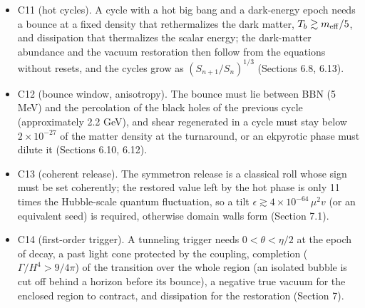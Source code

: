 \documentclass[11pt,a4paper]{article}
\begin{document}
\begin{itemize}
\item C11 (hot cycles). A cycle with a hot big bang and a dark-energy epoch needs a bounce at a fixed density that rethermalizes the dark matter, $T_b\gtrsim m_{\rm eff}/5$, and dissipation that thermalizes the scalar energy; the dark-matter abundance and the vacuum restoration then follow from the equations without resets, and the cycles grow as $(S_{n+1}/S_n)^{1/3}$ (Sections 6.8, 6.13).
\item C12 (bounce window, anisotropy). The bounce must lie between BBN (5 MeV) and the percolation of the black holes of the previous cycle (approximately 2.2 GeV), and shear regenerated in a cycle must stay below $2\times10^{-27}$ of the matter density at the turnaround, or an ekpyrotic phase must dilute it (Sections 6.10, 6.12).
\end{itemize}
\begin{itemize}\item C13 (coherent release). The symmetron release is a classical roll whose sign must be set coherently; the restored value left by the hot phase is only 11 times the Hubble-scale quantum fluctuation, so a tilt $\epsilon\gtrsim4\times10^{-64}\,\mu^2v$ (or an equivalent seed) is required, otherwise domain walls form (Section 7.1).
\item C14 (first-order trigger). A tunneling trigger needs $0<\theta<\eta/2$ at the epoch of decay, a past light cone protected by the coupling, completion ($\Gamma/H^4>9/4\pi$) of the transition over the whole region (an isolated bubble is cut off behind a horizon before its bounce), a negative true vacuum for the enclosed region to contract, and dissipation for the restoration (Section 7).
\end{itemize}
\end{document}
